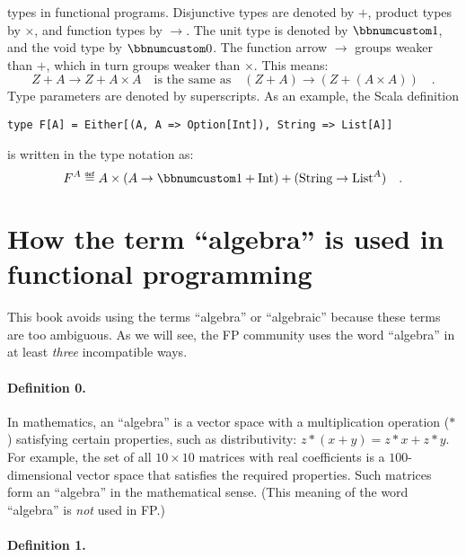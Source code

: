 \begin{description}
types in functional programs. Disjunctive types are denoted by $+$,
product types by $\times$, and function types by $\rightarrow$.
The unit type is denoted by $\bbnum 1$, and the void type by $\bbnum 0$.
The function arrow $\rightarrow$ groups weaker than $+$, which in
turn groups weaker than $\times$. This means:
\[
Z+A\rightarrow Z+A\times A\quad\text{is the same as}\quad\left(Z+A\right)\rightarrow\left(Z+\left(A\times A\right)\right)\quad.
\]
 Type parameters are denoted by superscripts. As an example, the Scala
definition\texttt{}
\begin{lstlisting}
type F[A] = Either[(A, A => Option[Int]), String => List[A]]
\end{lstlisting}
is written in the type notation as: 
\[
F^{A}\triangleq A\times\left(A\rightarrow\bbnum 1+\text{Int}\right)+(\text{String}\rightarrow\text{List}^{A})\quad.
\]
\end{description}

\section{How the term \textquotedblleft algebra\textquotedblright{} is used
in functional programming}

This book avoids using the terms \textsf{``}algebra\textsf{''} or
\textsf{``}algebraic\textsf{''} because these terms are too ambiguous.
As we will see, the FP community uses the word \textsf{``}algebra\textsf{''} in at
least \emph{three} incompatible ways.

\paragraph{Definition 0.}

In mathematics, an \textquotedblleft algebra\textquotedblright{} is
a vector space with a multiplication operation ($*$) satisfying certain
properties, such as distributivity: $z*(x+y)=z*x+z*y$. For example,
the set of all $10\times10$ matrices with real coefficients is a
$100$-dimensional vector space that satisfies the required properties.
Such matrices form an \textquotedblleft algebra\textquotedblright{}
in the mathematical sense. (This meaning of the word \textsf{``}algebra\textsf{''}
is \emph{not} used in FP.)

\paragraph{Definition 1.}

